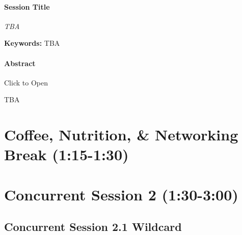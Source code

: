 \documentclass[
]{book}
\begin{document}
\begin{speaker}
\hypertarget{session-title}{%
\paragraph{\texorpdfstring{\textbf{Session
Title}}{Session Title}}\label{session-title}}

\emph{TBA}

\textbf{Keywords:} TBA

\hypertarget{abstract}{%
\paragraph{Abstract}\label{abstract}}

Click to Open

TBA
\end{speaker}

\hypertarget{coffee-nutrition-networking-break-115-130}{%
\section*{Coffee, Nutrition, \& Networking Break (1:15-1:30)}\label{coffee-nutrition-networking-break-115-130}}

\hypertarget{concurrent-session-2-130-300}{%
\section*{Concurrent Session 2 (1:30-3:00)}\label{concurrent-session-2-130-300}}

\hypertarget{concurrent-session-2.1-wildcard}{%
\subsection*{Concurrent Session 2.1 \textbar{} Wildcard}\label{concurrent-session-2.1-wildcard}}
\end{document}
